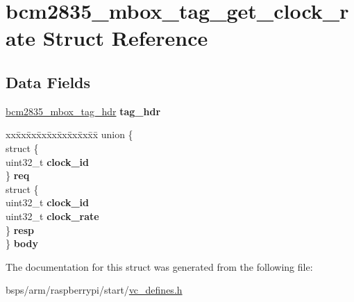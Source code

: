 \hypertarget{structbcm2835__mbox__tag__get__clock__rate}{}\section{bcm2835\+\_\+mbox\+\_\+tag\+\_\+get\+\_\+clock\+\_\+rate Struct Reference}
\label{structbcm2835__mbox__tag__get__clock__rate}
\subsection*{Data Fields}
\begin{DoxyCompactItemize}
\item 
\mbox{\label{structbcm2835__mbox__tag__get__clock__rate_ae05aab55ac5cd6e0160091b2cdf2db11}} 
\mbox{\hyperlink{structbcm2835__mbox__tag__hdr}{bcm2835\+\_\+mbox\+\_\+tag\+\_\+hdr}} {\bfseries tag\+\_\+hdr}
\item 
\mbox{\label{structbcm2835__mbox__tag__get__clock__rate_a7ebde7bb56f43184cc733a6c267aaf2c}} 
\begin{tabbing}
xx\=xx\=xx\=xx\=xx\=xx\=xx\=xx\=xx\=\kill
union \{\\
\>struct \{\\
\>\>uint32\_t {\bfseries clock\_id}\\
\>\} {\bfseries req}\\
\>struct \{\\
\>\>uint32\_t {\bfseries clock\_id}\\
\>\>uint32\_t {\bfseries clock\_rate}\\
\>\} {\bfseries resp}\\
\} {\bfseries body}\\

\end{tabbing}\end{DoxyCompactItemize}


The documentation for this struct was generated from the following file\+:\begin{DoxyCompactItemize}
\item 
bsps/arm/raspberrypi/start/\mbox{\hyperlink{vc__defines_8h}{vc\+\_\+defines.\+h}}\end{DoxyCompactItemize}
